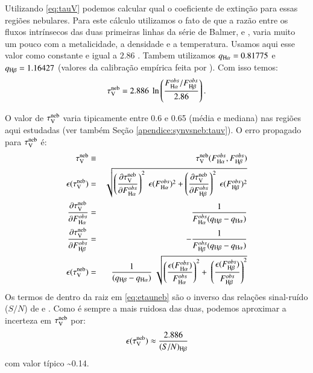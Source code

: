 Utilizando \eqref{eq:tauV} podemos calcular qual o coeficiente de extinção para essas regiões nebulares. Para este cálculo utilizamos o fato de que a razão entre os fluxos intrínsecos das duas primeiras linhas da série de Balmer, \Ha e \Hb, varia muito um pouco com a metalicidade, a densidade e a temperatura. Usamos aqui esse valor como constante e igual a $2.86$ \citep[densidade eletrônica de $n = 100\ cm^{-3}$ e temperatura eletrônica $T_e = 10^4$ K; ][]{Osterbrock.Ferland.2006a}. Tambem utilizamos $q_{\Ha}  = 0.81775$ e $q_{\Hb} = 1.16427$ (valores da calibração empírica feita por \citeauthor{CCM1989a}). Com isso temos:
\begin{equation}
	\tauVN = 2.886\ \ln \left( \frac{F_{\Ha}^{obs}/F_{\Hb}^{obs}}{2.86} \right).
\end{equation}

O valor de $\tau_{\mathrm{V}}^{\mathrm{neb}}$ varia tipicamente entre 0.6 e 0.65 (média e mediana) nas regiões aqui estudadas (ver também Seção \ref{apendice:synvsneb:tauv}).
O erro propagado para $\tau_{\mathrm{V}}^{\mathrm{neb}}$ é:
\begin{eqnarray}
	\tauVN &\equiv& \tauVN(F_{\Ha}^{obs}, F_{\Hb}^{obs}) \\
	\epsilon (\tauVN) &=& \sqrt{\left(\del{\tauVN}{F_{\Ha}^{obs}}\right)^2 \
\epsilon (F_{\Ha}^{obs})^2 + \left(\del{\tauVN}{F_{\Hb}^{obs}}\right)^2 \
\epsilon (F_{\Hb}^{obs})^2 } \\
	\del{\tauVN}{F_{\Ha}^{obs}} &=& \frac{1}{F_{\Ha}^{obs} (q_{\Hb} - q_{\Ha})} \\
	\del{\tauVN}{F_{\Hb}^{obs}} &=& - \frac{1}{F_{\Hb}^{obs} (q_{\Hb} - q_{\Ha})} \\
	\epsilon (\tauVN) &=& \frac{1}{(q_{\Hb} - q_{\Ha})} \
\sqrt{\left(\frac{\epsilon (F_{\Ha}^{obs})}{F_{\Ha}^{obs}}\right)^2 + \
\left(\frac{\epsilon (F_{\Hb}^{obs})}{F_{\Hb}^{obs}}\right)^2 }
	\label{eq:etauneb}
\end{eqnarray}
\noindent Os termos de dentro da raiz em \eqref{eq:etauneb} são o inverso das relações sinal-ruído ($S/N$) de \Ha e \Hb. Como \Hb é sempre a mais ruidosa das duas, podemos aproximar a incerteza em $\tau_{\mathrm{V}}^{\mathrm{neb}}$ por:
\begin{equation}
	\epsilon (\tauVN) \approx \frac{2.886}{(S/N)_{\Hb}}
	\label{eq:etaunebaprox}
\end{equation}
\noindent com valor típico \sim 0.14.

